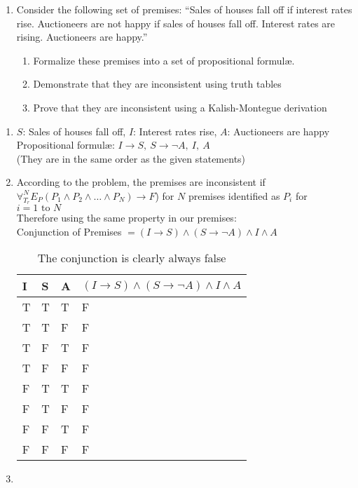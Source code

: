 \documentclass[12pt]{article}
\newenvironment{solution}[2][Solution]{ \begin{trivlist}
\item[\hskip \labelsep {\bfseries #1}]}{\end{trivlist}}
\newenvironment{problem}[2][Problem]{\begin{trivlist}
\item[\hskip \labelsep {\bfseries #1}\hskip \labelsep {\bfseries #2.}]}{\end{trivlist}}
\begin{document}
\begin{problem}{5}
\begin{enumerate}
\item Consider the following set of premises: ``Sales of houses fall off if interest rates rise. Auctioneers are not happy if sales of houses fall off. Interest rates are rising. Auctioneers are happy.''
  \begin{enumerate}
  \item Formalize these premises into a set of propositional formul{\ae}.
  \item Demonstrate that they are inconsistent using truth tables
  \item Prove that they are inconsistent using a Kalish-Montegue derivation
  \end{enumerate}
\end{enumerate}
\end{problem}
\begin{solution}{5}
\item[]
\begin{enumerate}
  \itemsep=0in
\item $S$: Sales of houses fall off, $I$: Interest rates rise, $A$: Auctioneers are happy \\
Propositional formul\ae: $I \rightarrow S,\ S \rightarrow \lnot A,\ I,\ A$ \\ (They are in the same order as the given statements)
\item According to the problem, the premises are inconsistent if $\forall_{T_r}^N E_P(P_1 \wedge P_2 \wedge \ldots \wedge P_N) \rightarrow F$) for $N$ premises identified as $P_i$ for $i = 1 \mbox{ to } N$ \\ Therefore using the same property in our premises:\\
Conjunction of Premises $= (I \rightarrow S) \wedge (S \rightarrow \lnot A) \wedge I \wedge A$ \\

\begin{table}[!h]
\centering
\caption{The conjunction is clearly always false}
\label{my-label}
\begin{tabular}{|l|l|l|l|}
\hline
I & S & A & $(I \rightarrow S) \wedge (S \rightarrow \lnot A) \wedge I \wedge A$ \\ \hline
T & T & T & F \\ \hline
T & T & F & F \\ \hline
T & F & T & F \\ \hline
T & F & F & F \\ \hline
F & T & T & F \\ \hline
F & T & F & F \\ \hline
F & F & T & F \\ \hline
F & F & F & F \\ \hline
\end{tabular}
\end{table}

\item \pagebreak

\end{enumerate}
\end{solution}
\end{document}
